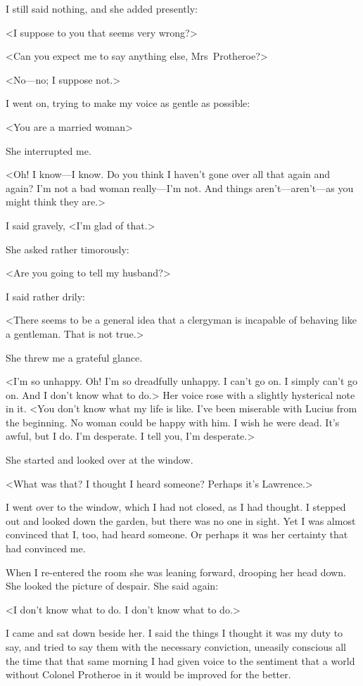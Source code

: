 I still said nothing, and she added presently:

<I suppose to you that seems very wrong?>

<Can you expect me to say anything else, Mrs~Protheroe?>

<No—no; I suppose not.>

I went on, trying to make my voice as gentle as possible:

<You are a married woman\longdash>

She interrupted me.

<Oh! I know—I know. Do you think I haven't gone over all that again and again? I'm not a bad woman really—I'm not. And things aren't—aren't—as you might think they are.>

I said gravely, <I'm glad of that.>

She asked rather timorously:

<Are you going to tell my husband?>

I said rather drily:

<There seems to be a general idea that a clergyman is incapable of behaving like a gentleman. That is not true.>

She threw me a grateful glance.

<I'm so unhappy. Oh! I'm so dreadfully unhappy. I can't go on. I simply can't go on. And I don't know what to do.> Her voice rose with a slightly hysterical note in it. <You don't know what my life is like. I've been miserable with Lucius from the beginning. No woman could be happy with him. I wish he were dead. It's awful, but I do. I'm desperate. I tell you, I'm desperate.>

She started and looked over at the window.

<What was that? I thought I heard someone? Perhaps it's Lawrence.>

I went over to the window, which I had not closed, as I had thought. I stepped out and looked down the garden, but there was no one in sight. Yet I was almost convinced that I, too, had heard someone. Or perhaps it was her certainty that had convinced me.

When I re-entered the room she was leaning forward, drooping her head down. She looked the picture of despair. She said again:

<I don't know what to do. I don't know what to do.>

I came and sat down beside her. I said the things I thought it was my duty to say, and tried to say them with the necessary conviction, uneasily conscious all the time that that same morning I had given voice to the sentiment that a world without Colonel Protheroe in it would be improved for the better.

